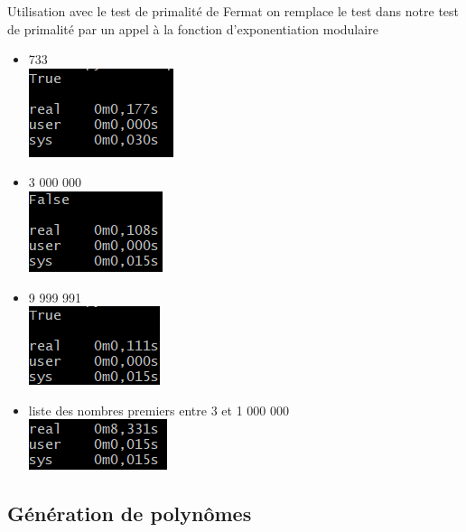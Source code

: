\documentclass{beamer}
\begin{document}
\begin{frame}
\begin{block}{Utilisation avec le test de primalité de Fermat}
on remplace le test dans notre test de primalité par un appel à la fonction d'exponentiation modulaire
\end{block}
\end{frame}

\begin{frame}
\begin{itemize}
\item 733\\ \includegraphics[scale=0.7]{images/expo1.png}
\item 3 000 000\\ \includegraphics[scale=0.7]{images/expo4.png}
\item 9 999 991\\ \includegraphics[scale=0.7]{images/expo5.png}
\item liste des nombres premiers entre 3 et 1 000 000\\
\includegraphics[scale=0.9]{images/expo_1000000.png}
\end{itemize}
\end{frame}

\subsection{Génération de polynômes}
\begin{frame}

\end{frame}
\end{document}
